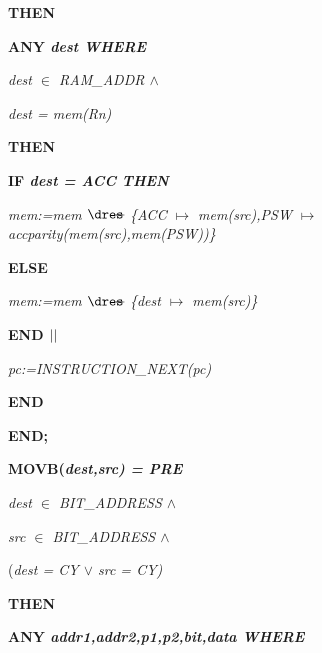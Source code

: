 \begin{sloppypar}
\hspace*{0.10in}\bf THEN

\hspace*{0.20in}\bf ANY \it dest \bf WHERE

\hspace*{0.30in}\it dest $\in$  \it RAM\_ADDR  $\land$ 

\hspace*{0.30in}\it dest \rm = \it mem\rm (\it Rn\rm )

\hspace*{0.20in}\bf THEN

\hspace*{0.30in}\bf IF \it dest \rm = \it ACC \bf THEN

\hspace*{0.40in}\it mem\rm :=\it mem $\lover$ \rm \{\it ACC $\mapsto$ \it mem\rm (\it src\rm )\rm ,\it PSW $\mapsto$ \it accparity\rm (\it mem\rm (\it src\rm )\rm ,\it mem\rm (\it PSW\rm )\rm )\rm \}

\hspace*{0.30in}\bf ELSE

\hspace*{0.40in}\it mem\rm :=\it mem $\lover$ \rm \{\it dest $\mapsto$ \it mem\rm (\it src\rm )\rm \}

\hspace*{0.30in}\bf END  $\mbox{$\mid\mid$}$ 

\hspace*{0.30in}\it pc\rm :=\it INSTRUCTION\_NEXT\rm (\it pc\rm )

\hspace*{0.20in}\bf END

\hspace*{0.10in}\bf END\rm ;

\hspace*{0.10in}\bf MOVB\rm (\it dest\rm ,\it src\rm ) \rm = \bf PRE

\hspace*{0.20in}\it dest $\in$  \it BIT\_ADDRESS  $\land$ 

\hspace*{0.20in}\it src $\in$  \it BIT\_ADDRESS  $\land$ 

\hspace*{0.20in}\rm (\it dest \rm = \it CY  $\lor$  \it src \rm = \it CY\rm )

\hspace*{0.10in}\bf THEN

\hspace*{0.20in}\bf ANY \it addr1\rm ,\it addr2\rm ,\it p1\rm ,\it p2\rm ,\it bit\rm ,\it data \bf WHERE


\end{sloppypar}
